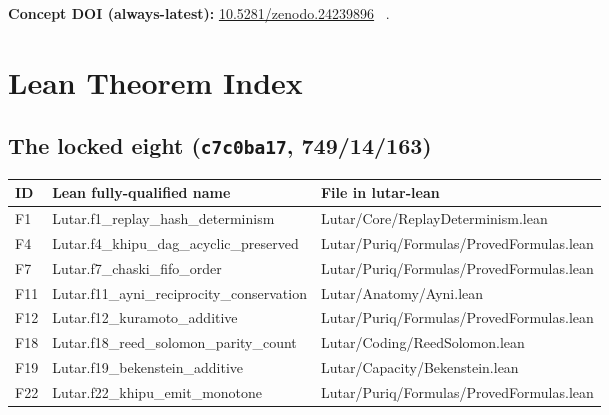 \documentclass[11pt,letterpaper]{article}
\newcommand{\lean}[1]{{\small\ttfamily #1}}
\newcommand{\lb}{\discretionary{}{}{}}
\theoremstyle{definition}
\begin{document}
\bigskip
\noindent\textbf{Concept DOI (always-latest):}
\href{https://doi.org/10.5281/zenodo.24239896}{10.5281/zenodo.24239896}%
~\cite{szl_concept}.





\appendix

\section{Lean Theorem Index}
\label{app:lean}

\subsection{The locked eight (\texttt{c7c0ba17}, 749/14/163)}

\begin{center}\small
\begin{tabular}{@{}p{0.5cm}p{5.5cm}p{6.0cm}@{}}
\toprule
\textbf{ID} & \textbf{Lean fully-qualified name} & \textbf{File in lutar-lean} \\
\midrule
F1  & \lean{Lutar.\lb f1\_\lb replay\_\lb hash\_\lb determinism}
    & \lean{Lutar/\lb Core/\lb ReplayDeterminism.\lb lean} \\
F4  & \lean{Lutar.\lb f4\_\lb khipu\_\lb dag\_\lb acyclic\_\lb preserved}
    & \lean{Lutar/\lb Puriq/\lb Formulas/\lb ProvedFormulas.\lb lean} \\
F7  & \lean{Lutar.\lb f7\_\lb chaski\_\lb fifo\_\lb order}
    & \lean{Lutar/\lb Puriq/\lb Formulas/\lb ProvedFormulas.\lb lean} \\
F11 & \lean{Lutar.\lb f11\_\lb ayni\_\lb reciprocity\_\lb conservation}
    & \lean{Lutar/\lb Anatomy/\lb Ayni.\lb lean} \\
F12 & \lean{Lutar.\lb f12\_\lb kuramoto\_\lb additive}
    & \lean{Lutar/\lb Puriq/\lb Formulas/\lb ProvedFormulas.\lb lean} \\
F18 & \lean{Lutar.\lb f18\_\lb reed\_\lb solomon\_\lb parity\_\lb count}
    & \lean{Lutar/\lb Coding/\lb ReedSolomon.\lb lean} \\
F19 & \lean{Lutar.\lb f19\_\lb bekenstein\_\lb additive}
    & \lean{Lutar/\lb Capacity/\lb Bekenstein.\lb lean} \\
F22 & \lean{Lutar.\lb f22\_\lb khipu\_\lb emit\_\lb monotone}
    & \lean{Lutar/\lb Puriq/\lb Formulas/\lb ProvedFormulas.\lb lean} \\
\bottomrule
\end{tabular}
\end{center}
\end{document}
